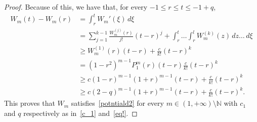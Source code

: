 \documentclass[10pt,a4paper]{amsart}
\newcommand{\N}{\mathbb{N}}
\renewcommand{\geq}{\geqslant}
\renewcommand{\leq}{\leqslant}
\begin{document}
\begin{proof}
Because of this, we have that, for every $-1\leq r\leq t\leq -1+q$,
\begin{equation*}
\begin{split}
W_m(t)-W_m(r)&=\int_{r}^tW_m'(\xi)\,d\xi\\
&=\sum_{j=1}^{k-1} \frac{W_m^{(j)}(r)}{j!}(t-r)^j+\int_{r}^t\dots \int_{r}^l W_m^{(k)}(z)\,dz\dots\,d\xi\\
&\geq W_m^{(1)}(r)(t-r)  + \frac{c}{k!}(t-r)^k\\
&=(1-r^2)^{m-1}P_1^m(r)(t-r) \frac{c}{k!}(t-r)^k\\
&\geq c(1-r)^{m-1}(1+r)^{m-1}(t-r)+\frac{c}{k!}(t-r)^k\\
&\geq c(2-q)^{m-1}(1+r)^{m-1}(t-r)+\frac{c}{k!}(t-r)^k.
\end{split}
\end{equation*}
This proves that $W_{m}$ satisfies~\eqref{potntiald2} for every $m\in (1,+\infty)\setminus \N$ with $c_1$ and $q$ respectively as in~\eqref{c_1} and~\eqref{eq!}.  
\end{proof}
\end{document}

